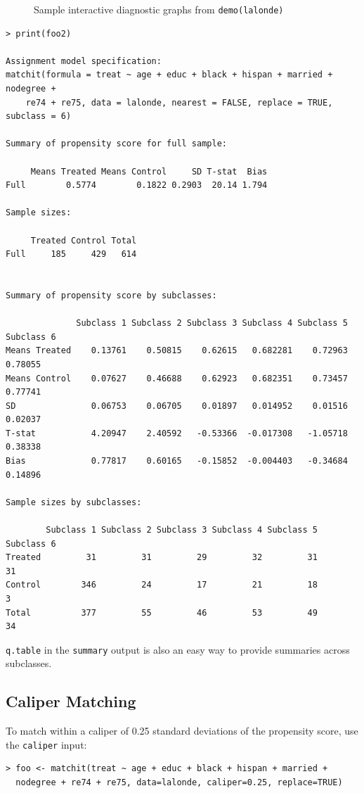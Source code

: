 \documentclass[oneside,letterpaper,titlepage]{article}
\begin{document}
\begin{figure}[tbp]
\begin{center}
    \hfill
    \caption{Sample interactive diagnostic graphs from \texttt{demo(lalonde)}}
\label{diags}
\end{center}
\end{figure}


\begin{verbatim}
> print(foo2)
 
Assignment model specification:
matchit(formula = treat ~ age + educ + black + hispan + married + nodegree + 
    re74 + re75, data = lalonde, nearest = FALSE, replace = TRUE, subclass = 6)
 
Summary of propensity score for full sample:
 
     Means Treated Means Control     SD T-stat  Bias
Full        0.5774        0.1822 0.2903  20.14 1.794
 
Sample sizes:
 
     Treated Control Total
Full     185     429   614
 
 
Summary of propensity score by subclasses:
 
              Subclass 1 Subclass 2 Subclass 3 Subclass 4 Subclass 5 Subclass 6
Means Treated    0.13761    0.50815    0.62615   0.682281    0.72963    0.78055
Means Control    0.07627    0.46688    0.62923   0.682351    0.73457    0.77741
SD               0.06753    0.06705    0.01897   0.014952    0.01516    0.02037
T-stat           4.20947    2.40592   -0.53366  -0.017308   -1.05718    0.38338
Bias             0.77817    0.60165   -0.15852  -0.004403   -0.34684    0.14896
 
Sample sizes by subclasses:
 
        Subclass 1 Subclass 2 Subclass 3 Subclass 4 Subclass 5 Subclass 6
Treated         31         31         29         32         31         31
Control        346         24         17         21         18          3
Total          377         55         46         53         49         34
\end{verbatim}

\noindent \texttt{q.table} in the {\tt summary} output is also an easy way to provide summaries across
subclasses.  

\subsection{Caliper Matching}

To match within a caliper of 0.25 standard deviations of the
propensity score, use the \texttt{caliper} input:

\begin{verbatim}
> foo <- matchit(treat ~ age + educ + black + hispan + married +
  nodegree + re74 + re75, data=lalonde, caliper=0.25, replace=TRUE)
\end{verbatim}
\end{document}

